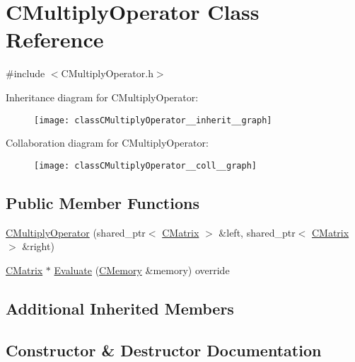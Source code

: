 \hypertarget{classCMultiplyOperator}{}\section{C\+Multiply\+Operator Class Reference}
\label{classCMultiplyOperator}


{\ttfamily \#include $<$C\+Multiply\+Operator.\+h$>$}



Inheritance diagram for C\+Multiply\+Operator\+:\nopagebreak
\begin{figure}[H]
\begin{center}
\leavevmode
\texttt{[image: classCMultiplyOperator\_\_inherit\_\_graph]}
\end{center}
\end{figure}


Collaboration diagram for C\+Multiply\+Operator\+:\nopagebreak
\begin{figure}[H]
\begin{center}
\leavevmode
\texttt{[image: classCMultiplyOperator\_\_coll\_\_graph]}
\end{center}
\end{figure}
\subsection*{Public Member Functions}
\begin{DoxyCompactItemize}
\item 
\hyperlink{classCMultiplyOperator_a18013bd183ce4302192adb52843779fb}{C\+Multiply\+Operator} (shared\+\_\+ptr$<$ \hyperlink{classCMatrix}{C\+Matrix} $>$ \&left, shared\+\_\+ptr$<$ \hyperlink{classCMatrix}{C\+Matrix} $>$ \&right)
\item 
\hyperlink{classCMatrix}{C\+Matrix} $\ast$ \hyperlink{classCMultiplyOperator_a5acd8e1569398963bb2d80846ec1656e}{Evaluate} (\hyperlink{classCMemory}{C\+Memory} \&memory) override
\end{DoxyCompactItemize}
\subsection*{Additional Inherited Members}


\subsection{Constructor \& Destructor Documentation}
